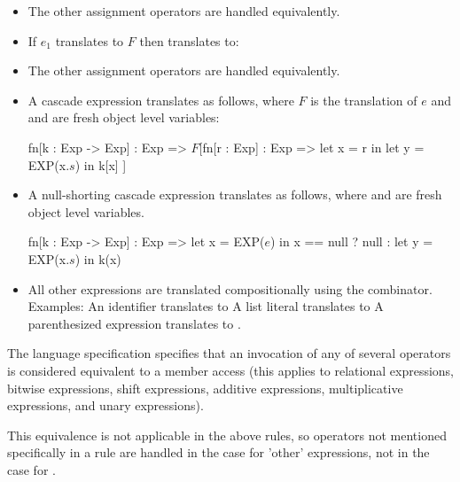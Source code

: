 \documentclass[makeidx]{article}
\begin{document}
\begin{itemize}
\item The other assignment operators are handled equivalently.
\item If $e_1$ translates to $F$ then  translates to:
\item The other assignment operators are handled equivalently.
\item A cascade expression  translates as follows, where $F$ is the
  translation of $e$ and   and  are fresh object level variables:
  \begin{dartCode}
    fn[k : Exp -> Exp] : Exp =>
       $F$[fn[r : Exp] : Exp => let x = r in
                              let y = EXP(x.$s$)
                              in k[x]
       ]
  \end{dartCode}
\item A null-shorting cascade expression  translates as follows, where 
  and  are fresh object level variables.
  \begin{dartCode}
     fn[k : Exp -> Exp] : Exp =>
         let x = EXP($e$) in x == null ? null : let y = EXP(x.$s$) in k(x)
  \end{dartCode}
\item All other expressions are translated compositionally using the 
  combinator.  Examples:
  An identifier  translates to 
  A list literal \code{[$e_1$, \ldots, $e_n$]} translates to 
  A parenthesized expression  translates to .
\end{itemize}

The language specification specifies that an invocation of any of several
operators is considered equivalent to a member access (this applies to
relational expressions, bitwise expressions, shift expressions, additive
expressions, multiplicative expressions, and unary expressions).


This equivalence is not applicable in the above rules, so operators not
mentioned specifically in a rule are handled in the case for 'other'
expressions, not in the case for .
\end{document}
